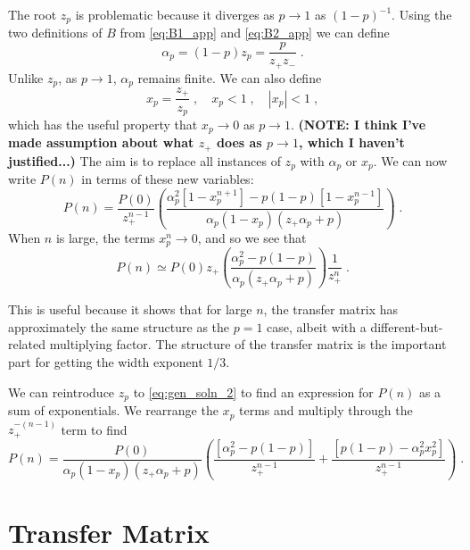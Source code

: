 \documentclass[a4paper,10pt]{article}
\begin{document}
The root $z_p$ is problematic because it diverges as $p\to1$ as $(1-p)^{-1}$. Using the two definitions of $B$ from \eqref{eq:B1_app} and \eqref{eq:B2_app} we can define
\begin{equation}\label{eq:alpha_p_defn_app}
  \alpha_p = (1-p)z_p = \frac{p}{z_+z_-} \;.
\end{equation}
Unlike $z_p$, as $p\to 1$, $\alpha_p$ remains finite. We can also define
\begin{equation}
  x_p = \frac{z_+}{z_p} \;, \quad x_p < 1 \;, \quad |x_p| < 1 \;, 
\end{equation}
which has the useful property that $x_p \to 0$ as $p\to 1$. {\bf (NOTE: I think I've made assumption about what $z_+$ does as $p\to 1$, which I haven't justified...)} The aim is to replace all instances of $z_p$ with $\alpha_p$ or $x_p$.
We can now write $P(n)$ in terms of these new variables:
\begin{equation}\label{eq:gen_soln_2}
  P(n) = \frac{P(0)}{z_+^{n-1}} \left( \frac{ \alpha_p^{2}[1 - x_p^{n+1}] - p  (1-p) [ 1 - x_p^{n-1}]}{ \alpha_p(1-x_p)(z_+\alpha_p + p)} \right) \;. 
\end{equation}
When $n$ is large, the terms $x_p^n \to 0$, and so we see that
\begin{equation}
  P(n) \simeq P(0) z_+ \left( \frac{ \alpha_p^{2} - p  (1-p) }{ \alpha_p(z_+\alpha_p + p)} \right) \frac{1}{z_+^{n}} \;. 
\end{equation}

This is useful because it shows that for large $n$, the transfer matrix has approximately the same structure as the $p=1$ case, albeit with a different-but-related multiplying factor. The structure of the transfer matrix is the important part for getting the width exponent $1/3$.


We can reintroduce $z_p$ to \eqref{eq:gen_soln_2} to find an expression for $P(n)$ as a sum of exponentials. We rearrange the $x_p$ terms and multiply through the $z_+^{-(n-1)}$ term to find
\begin{equation}\label{eq:gen_soln_3}
  P(n) = \frac{P(0)}{ \alpha_p(1-x_p)(z_+\alpha_p + p)} \left( \frac{[\alpha_p^{2}-p(1-p)]}{z_+^{n-1}} + \frac{[ p(1-p) - \alpha_p^2 x_p^2]}{z_+^{n-1}}  \right) \;. 
\end{equation}


\section{Transfer Matrix}
\end{document}
